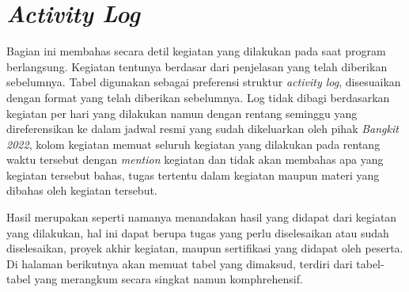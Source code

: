 \section*{\textit{Activity Log}}

Bagian ini membahas secara detil kegiatan yang dilakukan pada saat program berlangsung. Kegiatan tentunya berdasar dari penjelasan yang telah diberikan sebelumnya. Tabel digunakan sebagai preferensi struktur \textit{activity log}, disesuaikan dengan format yang telah diberikan sebelumnya. Log tidak dibagi berdasarkan kegiatan per hari yang dilakukan namun dengan rentang seminggu yang direferensikan ke dalam jadwal resmi yang sudah dikeluarkan oleh pihak \textit{Bangkit 2022}, kolom kegiatan memuat seluruh kegiatan yang dilakukan pada rentang waktu tersebut dengan \textit{mention} kegiatan dan tidak akan membahas apa yang kegiatan tersebut bahas, tugas tertentu dalam kegiatan maupun materi yang dibahas oleh kegiatan tersebut.


Hasil merupakan seperti namanya menandakan hasil yang didapat dari kegiatan yang dilakukan, hal ini dapat berupa tugas yang perlu diselesaikan atau sudah diselesaikan, proyek akhir kegiatan, maupun sertifikasi yang didapat oleh peserta. Di halaman berikutnya akan memuat tabel yang dimaksud, terdiri dari tabel-tabel yang merangkum secara singkat namun komphrehensif.








